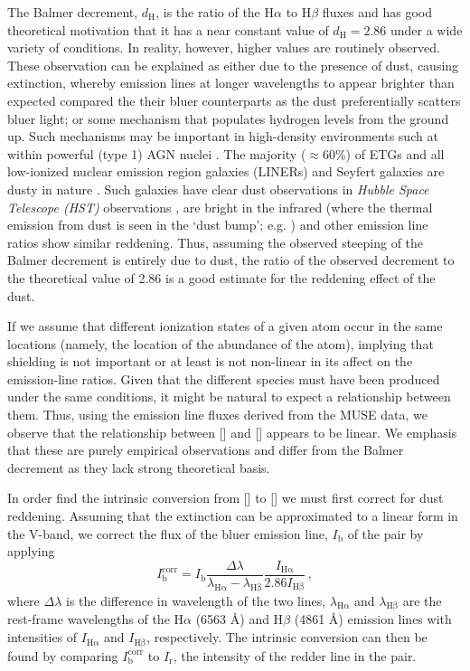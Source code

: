 		The Balmer decrement, $d_\mathrm{H}$, is the ratio of the H$\alpha$ to H$\beta$ fluxes and has good theoretical motivation that it has a near constant value of $d_\mathrm{H} = 2.86$ under a wide variety of conditions. In reality, however, higher values are routinely observed. These observation can be explained as either due to the presence of dust, causing extinction, whereby emission lines at longer wavelengths to appear brighter than expected compared the their bluer counterparts as the dust preferentially scatters bluer light; or some mechanism that populates hydrogen levels from the ground up. Such mechanisms may be important in high-density environments such at within powerful (type 1) AGN nuclei \citep[e.g.][]{Shields1974, Netzer1975}. The majority ($\approx 60$\%) of ETGs and all low-ionized nuclear emission region galaxies (LINERs) and Seyfert galaxies are dusty in nature \citep[e.g.][]{Martini2013}. Such galaxies have clear dust observations in \textit{Hubble Space Telescope (HST)} observations \citep[e.g.][]{Martini2013}, are bright in the infrared (where the thermal emission from dust is seen in the `dust bump'; e.g. \citealt{Jura1987, Knapp1992}) and other emission line ratios \citep[e.g.  in ][]{Wampler1968} show similar reddening. Thus, assuming the observed steeping of the Balmer decrement is entirely due to dust, the ratio of the observed decrement to the theoretical value of 2.86 is a good estimate for the reddening effect of the dust.

		If we assume that different ionization states of a given atom occur in the same locations (namely, the location of the abundance of the atom), implying that shielding is not important or at least is not non-linear in its affect on the emission-line ratios. Given that the different species must have been produced under the same conditions, it might be natural to expect a relationship between them. Thus, using the emission line fluxes derived from the MUSE data, we observe that the relationship between [] and [] appears to be linear. We emphasis that these are purely empirical observations and differ from the Balmer decrement as they lack strong theoretical basis. 

		In order find the intrinsic conversion from [] to [] we must first correct for dust reddening. Assuming that the extinction can be approximated to a linear form in the V-band, we correct the flux of the bluer emission line, $I_\mathrm{b}$ of the pair by applying
		\begin{equation}
			I^\mathrm{corr}_\mathrm{b} = I_\mathrm{b} \frac{\Delta\lambda}{\lambda_\mathrm{H\alpha} - \lambda_\mathrm{H\beta}} \frac{I_\mathrm{H\alpha}}{2.86 I_\mathrm{H\beta}} \, ,
		\end{equation}
		where $\Delta\lambda$ is the difference in wavelength of the two lines, $\lambda_\mathrm{H\alpha}$ and $\lambda_\mathrm{H\beta}$ are the rest-frame wavelengths of the H$\alpha$ (6563 \AA) and H$\beta$ (4861 \AA) emission lines with intensities of $I_\mathrm{H\alpha}$ and $I_\mathrm{H\beta}$, respectively. The intrinsic conversion can then be found by comparing $I^\mathrm{corr}_\mathrm{b}$ to $I_\mathrm{r}$, the intensity of the redder line in the pair. 

